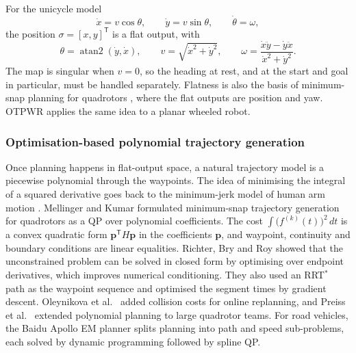 \documentclass[11pt,a4paper]{article}
\begin{document}
For the unicycle model
\begin{equation}
  \dot x = v\cos\theta,\qquad
  \dot y = v\sin\theta,\qquad
  \dot\theta = \omega,
\end{equation}
the position $\sigma=[x,y]^{\mathsf T}$ is a flat output, with
\begin{equation}
  \theta=\operatorname{atan2}(\dot y,\dot x),\qquad
  v=\sqrt{\dot x^2+\dot y^2},\qquad
  \omega=\frac{\dot x\ddot y-\dot y\ddot x}{\dot x^2+\dot y^2}.
\end{equation}
The map is singular when $v=0$, so the heading at rest, and at the start and
goal in particular, must be handled separately. Flatness is also the basis
of minimum-snap planning for quadrotors \citep{mellinger2011minimum}, where
the flat outputs are position and yaw. OTPWR applies the same idea to a
planar wheeled robot.

\subsubsection{Optimisation-based polynomial trajectory generation}
\label{sec:lit-poly}

Once planning happens in flat-output space, a natural trajectory model is a
piecewise polynomial through the waypoints. The idea of minimising the
integral of a squared derivative goes back to the minimum-jerk model of human
arm motion \citep{flash1985coordination}. Mellinger and Kumar
\citep{mellinger2011minimum} formulated minimum-snap trajectory generation
for quadrotors as a QP over polynomial coefficients. The cost
$\int\!\big(f^{(k)}(t)\big)^2\,dt$ is a convex quadratic form
$\mathbf p^{\mathsf T}H\mathbf p$ in the coefficients $\mathbf p$, and
waypoint, continuity and boundary conditions are linear equalities. Richter,
Bry and Roy \citep{richter2016polynomial} showed that the unconstrained
problem can be solved in closed form by optimising over endpoint derivatives,
which improves numerical conditioning. They also used an RRT$^\ast$ path as
the waypoint sequence and optimised the segment times by gradient descent.
Oleynikova et al.\ \citep{oleynikova2016continuous} added collision costs for
online replanning, and Preiss et al.\ \citep{preiss2017downwash} extended
polynomial planning to large quadrotor teams. For road vehicles, the Baidu
Apollo EM planner \citep{fan2018baidu} splits planning into path and speed
sub-problems, each solved by dynamic programming followed by spline QP.
\end{document}
